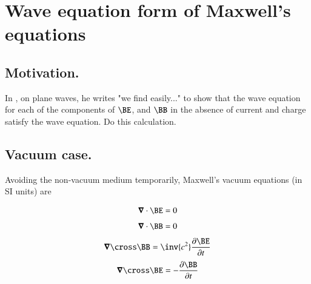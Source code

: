 
%
%
%




\chapter{Wave equation form of Maxwell's equations}\label{chap:emVacWave}
\date{ June 21, 2009.  $RCSfile: emVacWave.tex,v $ Last $Revision: 1.4 $ $Date: 2009/07/09 03:04:06 $ }

%


\section{Motivation.}

In \cite{jackson1975cew}, on plane waves, he writes "we find easily..." to show that the wave equation for each of the components of $\BE$, and $\BB$ in the absence of current and charge satisfy the wave equation.  Do this calculation.

\section{Vacuum case.}

Avoiding the non-vacuum medium temporarily, Maxwell's vacuum equations (in SI units) are

\begin{align}\label{eqn:emVacWave:divE}
\spacegrad \cdot \BE = 0
\end{align}
\begin{align}\label{eqn:emVacWave:divB}
\spacegrad \cdot \BB = 0
\end{align}
\begin{align}\label{eqn:emVacWave:curlB}
\spacegrad \cross \BB = \inv{c^2} \frac{\partial \BE}{\partial t}
\end{align}
\begin{align}\label{eqn:emVacWave:curlE}
\spacegrad \cross \BE = -\frac{\partial \BB}{\partial t}
\end{align}

